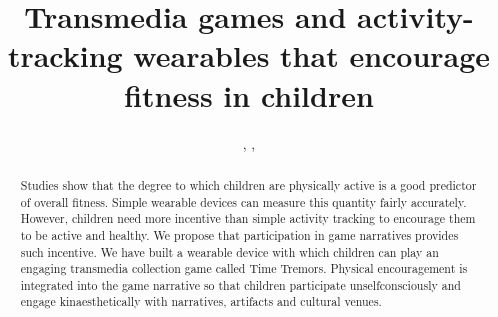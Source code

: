 \documentclass{SIGCHI2015LaTex/sigchi}
\begin{document}
\title{Transmedia games and activity-tracking wearables that encourage fitness in children}


\author{
, 
,
}




\maketitle

\begin{abstract}

Studies show that the degree to which children are physically active is a good predictor of overall fitness. Simple wearable devices can measure this quantity fairly accurately. However, children need more incentive than simple activity tracking to encourage them to be active and healthy. We propose that participation in game narratives provides such incentive. We have built a wearable device with which children can play an engaging transmedia collection game called Time Tremors. Physical encouragement is integrated into the game narrative so that children participate unselfconsciously and engage kinaesthetically with narratives, artifacts and cultural venues.

\end{abstract}
\end{document}
